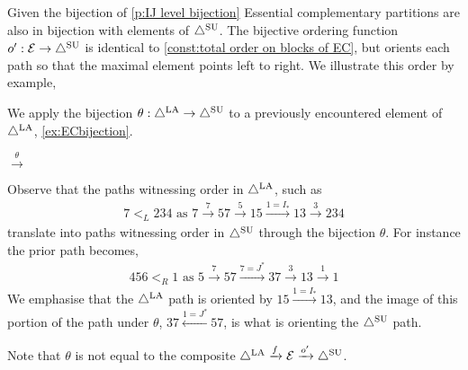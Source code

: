 Given the bijection of \cref{p:IJ level bijection} Essential complementary partitions are also in bijection with elements of $\triangle^{\mathrm{SU}}$. The bijective ordering function $o':\mathcal{E}\to \triangle^{\mathrm{SU}}$ is identical to \cref{const:total order on blocks of EC}, but orients each path so that the maximal element points left to right. We illustrate this order by example,
\begin{example}\label{ex:theta and path translation}
We apply the bijection $\theta:\triangle^{\mathrm{LA}}\to \triangle^{\mathrm{SU}}$ to a previously encountered element of $\triangle^{\mathrm{LA}}$, \cref{ex:ECbijection}.
\begin{center}
$
\xrightarrow{\theta}
$
\end{center}
Observe that the paths witnessing order in $\triangle^{\mathrm{LA}}$, such as 
\begin{align*}
	7 <_L 234 \text{ as } 7 \xrightarrow{7} 57 \xrightarrow{5} 15 \xrightarrow{1=I_*} 13 \xrightarrow{3} 234
\end{align*}
translate into paths witnessing order in $\triangle^{\mathrm{SU}}$ through the bijection $\theta$. For instance the prior path becomes,
\begin{align*}
	456 <_R 1 \text{ as } 5 \xrightarrow{7} 57 \xrightarrow{7=J^*} 37 \xrightarrow{3} 13 \xrightarrow{1} 1
\end{align*}
We emphasise that the $\triangle^{\mathrm{LA}}$ path is oriented by $15 \xrightarrow{1=I_*} 13$, and the image of this portion of the path under $\theta$, $37 \xleftarrow{1=J^*} 57$, is what is orienting the $\triangle^{\mathrm{SU}}$ path.
\end{example}
Note that $\theta$ is not equal to the composite $\triangle^{\mathrm{LA}} \xrightarrow{f} \mathcal{E} \xrightarrow{o'} \triangle^{\mathrm{SU}}$.


